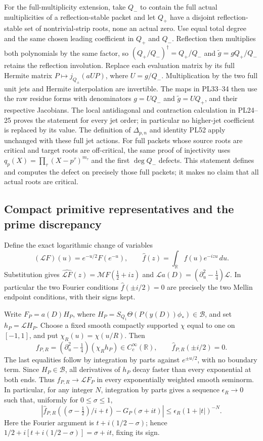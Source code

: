 \documentclass[11pt,a4paper]{article}
\theoremstyle{definition}\newtheorem{definition}[theorem]{Definition}
\begin{document}
For the full-multiplicity extension, take \(Q_-\) to contain the full
actual multiplicities of a reflection-stable packet and let \(Q_+\)
have a disjoint reflection-stable set of nontrivial-strip roots,
none an actual zero. Use equal total degree and the same chosen
leading coefficient in \(Q_+\) and \(Q_-\).
Reflection then multiplies both polynomials by the same factor,
so \((Q_+/Q_-)^\dagger=Q_+/Q_-\) and
\(\widetilde g=gQ_+/Q_-\) retains the reflection involution.
Replace each evaluation matrix by its full Hermite matrix
\(P\mapsto j_{Q_\pm}(aUP)\), where \(U=g/Q_-\).
Multiplication by the two full unit jets and Hermite interpolation
are invertible. The maps in PL33--34 then use the raw residue forms
with denominators \(g=UQ_-\) and \(\widetilde g=UQ_+\), and their
respective Jacobians. The local antidiagonal and contraction
calculation in PL24--25 proves the statement for every jet order;
in particular no higher-jet coefficient is replaced by its value.
The definition of \(\Delta_{p,n}\) and identity PL52 apply unchanged
with these full jet actions. For full packets whose source roots
are critical and target roots are off-critical, the same proof of injectivity
uses \(q_p(X)=\prod_{\tau}(X-p^\tau)^{m_\tau}\) and the first
\(\deg Q_-\) defects. This statement defines and computes the
defect on precisely those full packets; it makes no claim that
all actual roots are critical.

\subsection{Compact primitive representatives and the prime discrepancy}
Define the exact logarithmic change of variables
\[
 (\mathscr LF)(u)=e^{-u/2}F(e^{-u}),\qquad
 \widehat f(z)=\int_{\mathbb R}f(u)e^{-izu}\,du.
 \tag{PL36}
\]
Substitution gives
\(\widehat{\mathscr LF}(z)=\mathcal M F(\tfrac12+iz)\) and
\(\mathscr La(D)=(\partial_u^2-\tfrac14)\mathscr L\).
In particular the two Fourier conditions
\(\widehat f(\pm i/2)=0\) are precisely the two Mellin endpoint
conditions, with their signs kept.

Write \(F_P=a(D)H_P\), where
\(H_P=S_{Q_1}\Theta(P(y(D))\phi_*)\in\mathscr B\), and set
\(h_P=\mathscr LH_P\).
Choose a fixed smooth compactly supported \(\chi\) equal to one
on \([-1,1]\), and put \(\chi_R(u)=\chi(u/R)\). Then
\[
 f_{P,R}=(\partial_u^2-\tfrac14)(\chi_Rh_P)
             \in C_c^\infty(\mathbb R),\qquad
 \widehat f_{P,R}(\pm i/2)=0.
 \tag{PL37}\label{pl:pl:compact}
\]
The last equalities follow by integration by parts against
\(e^{\pm u/2}\), with no boundary term.
Since \(H_P\in\mathscr B\), all derivatives of \(h_P\) decay faster than
every exponential at both ends. Thus \(f_{P,R}\to\mathscr LF_P\)
in every exponentially weighted smooth seminorm.
In particular, for any integer \(N\), integration by parts gives
a sequence \(\epsilon_R\to0\) such that, uniformly for
\(0\le\sigma\le1\),
\[
 |\widehat f_{P,R}((\sigma-\tfrac12)/i+t)
          -G_P(\sigma+it)|\le\epsilon_R(1+|t|)^{-N}.
 \tag{PL38}\label{pl:pl:approx}
\]
Here the Fourier argument is \(t+i(1/2-\sigma)\); hence
\(1/2+i[t+i(1/2-\sigma)]=\sigma+it\), fixing its sign.
\end{document}
